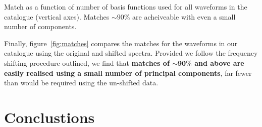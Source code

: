 \documentclass[a0,landscape]{a0poster}
\begin{document}
\begin{multicols}{4}
\begin{minipage}{\columnwidth}
\makeatletter
\newcommand{\@captype}{figure}
\makeatother
\centering
{}\qquad%
\caption{Match as a function of number of basis functions used for all waveforms
in the catalogue (vertical axes).  Matches $\sim 90\%$ are acheiveable with even
a small number of components.}
\label{fig:matches}
\end{minipage}


Finally, figure~\ref{fig:matches} compares the matches for the waveforms in our
catalogue using the original and shifted spectra.  Provided we follow the
frequency shifting procedure outlined, we find that {\bf matches of
    $\mathbf{\sim 90\%}$ and above are easily realised using a small number of
    principal components}, far fewer than would be required using the un-shifted
data.



\section*{Conclustions}


\end{multicols}
\end{document}
